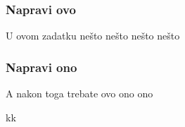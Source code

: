 \documentclass[class=article, crop=false]{standalone}
\begin{document}
\subsubsection{Napravi ovo}

U ovom zadatku nešto nešto nešto nešto



\subsubsection{Napravi ono}

A nakon toga trebate ovo ono ono


kk
\end{document}
